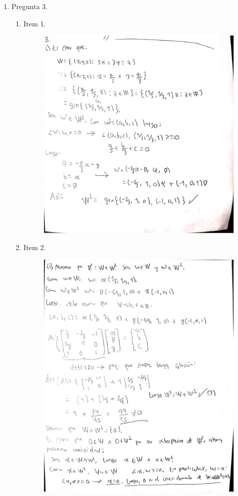 \documentclass[fleqn]{article}
\begin{document}
\begin{enumerate}
     \item Pregunta 3.
       \begin{enumerate}
         \item Item 1.
           \begin{figure}[H]
             \centering \includegraphics[scale=.55]{figs/3a}
         \end{figure} \newpage
         \item Item 2.
           \begin{figure}[H]
             \centering \includegraphics[scale=.6]{figs/3b1}

\end{figure}
\end{enumerate}
\end{enumerate}
\end{document}

